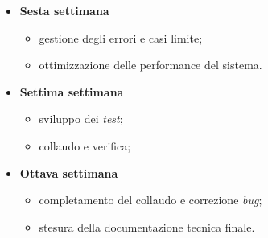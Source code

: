 \begin{itemize}
\begin{itemize}
        \end{itemize}
    \item \textbf{Sesta settimana }
        \begin{itemize}
            \item gestione degli errori e casi limite;
            \item ottimizzazione delle performance del sistema.
        \end{itemize}
    \item \textbf{Settima settimana}
        \begin{itemize}
            \item sviluppo dei \textit{test};
            \item collaudo e verifica;
        \end{itemize}
    \item \textbf{Ottava settimana}
        \begin{itemize}
            \item completamento del collaudo e correzione \textit{bug};
            \item stesura della documentazione tecnica finale.
        \end{itemize}
\end{itemize}

